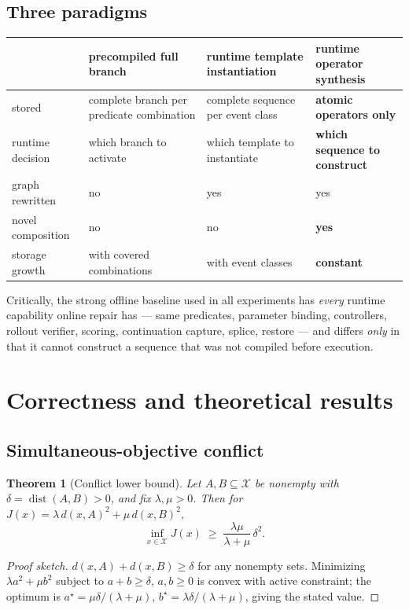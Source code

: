 \documentclass[11pt]{article}
\newtheorem{theorem}{Theorem}
\begin{document}
\subsection{Three paradigms}

\begin{center}
\begin{tabular}{p{}p{}p{}p{}}
\toprule
 & \textbf{precompiled full branch} & \textbf{runtime template instantiation}
 & \textbf{runtime operator synthesis} \\
\midrule
stored & complete branch per predicate combination & complete sequence per event
class & \textbf{atomic operators only} \\
runtime decision & which branch to activate & which template to instantiate
& \textbf{which sequence to construct} \\
graph rewritten & no & yes & yes \\
novel composition & no & no & \textbf{yes} \\
storage growth & with covered combinations & with event classes
& \textbf{constant} \\
\bottomrule
\end{tabular}
\end{center}

Critically, the strong offline baseline used in all experiments has
\emph{every} runtime capability online repair has --- same predicates, parameter
binding, controllers, rollout verifier, scoring, continuation capture, splice,
restore --- and differs \emph{only} in that it cannot construct a sequence that
was not compiled before execution.

\section{Correctness and theoretical results}

\subsection{Simultaneous-objective conflict}

\begin{theorem}[Conflict lower bound]
\label{thm:conflict}
Let $A,B\subseteq\mathcal X$ be nonempty with
$\delta=\operatorname{dist}(A,B)>0$, and fix $\lambda,\mu>0$. Then for
$J(x)=\lambda\,d(x,A)^2+\mu\,d(x,B)^2$,
\begin{equation}
\inf_{x\in\mathcal X}J(x)\;\ge\;\frac{\lambda\mu}{\lambda+\mu}\,\delta^2 .
\end{equation}
\end{theorem}
\begin{proof}[Proof sketch]
$d(x,A)+d(x,B)\ge\delta$ for any nonempty sets. Minimizing
$\lambda a^2+\mu b^2$ subject to $a+b\ge\delta$, $a,b\ge0$ is convex with active
constraint; the optimum is $a^\star=\mu\delta/(\lambda+\mu)$,
$b^\star=\lambda\delta/(\lambda+\mu)$, giving the stated value.
\end{proof}
\end{document}
